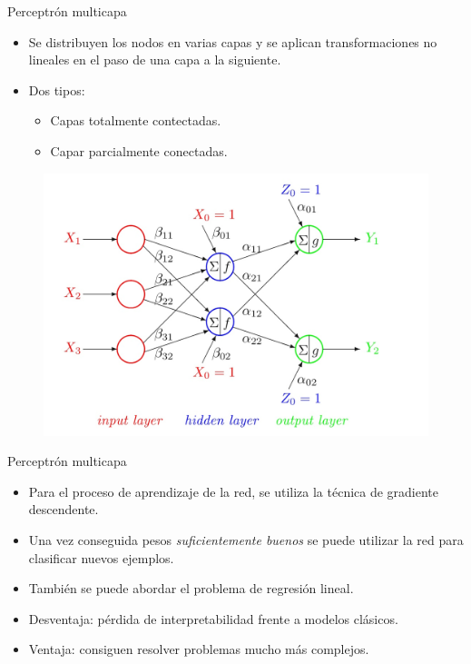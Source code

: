 \documentclass[spanish]{beamer}
\begin{document}
\begin{frame}{Perceptrón multicapa}
  \begin{itemize}
    \item Se distribuyen los nodos en varias capas y se aplican transformaciones no lineales en el paso de una capa a la siguiente.
    \item Dos tipos:
    \begin{itemize}
      \item Capas totalmente contectadas.
      \item Capar parcialmente conectadas.
    \end{itemize}
  \end{itemize}
  \begin{figure}[h]
    \centering
    \includegraphics[width=.7\textwidth]{img/multicapa}
  \end{figure}
\end{frame}

\begin{frame}{Perceptrón multicapa}
  \begin{itemize}
    \item Para el proceso de aprendizaje de la red, se utiliza la técnica de gradiente descendente.
    \item Una vez conseguida pesos \textit{suficientemente buenos} se puede utilizar la red para clasificar nuevos ejemplos.
    \item También se puede abordar el problema de regresión lineal.
    \item Desventaja: pérdida de interpretabilidad frente a modelos clásicos.
    \item Ventaja: consiguen resolver problemas mucho más complejos.
  \end{itemize}
\end{frame}
\end{document}
